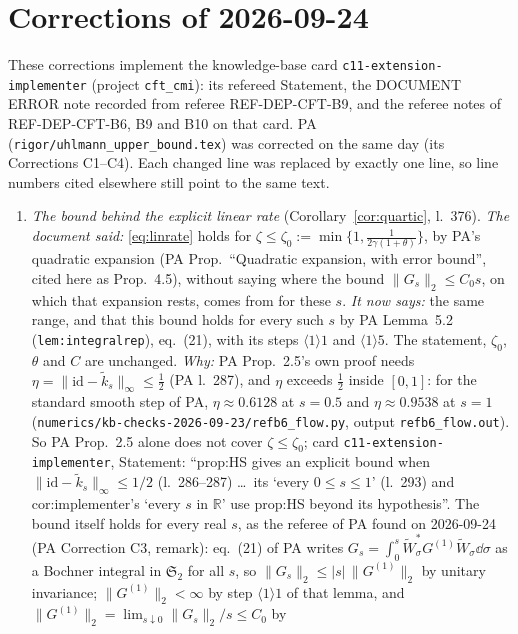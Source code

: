 \documentclass[11pt]{article}
\newcommand{\Wt}{\widetilde W}
\newcommand{\kt}{\widetilde k}
\newcommand{\Stwo}{\mathfrak S_2}
\newcommand{\norm}[1]{\lVert#1\rVert}
\newcommand{\abs}[1]{\lvert#1\rvert}
\begin{document}
\section{Corrections of 2026-09-24}\label{corr0924:sec}
\sloppy
These corrections implement the knowledge-base card \texttt{c11-extension-implementer} (project
\texttt{cft\_cmi}): its refereed Statement, the DOCUMENT ERROR note recorded from referee
REF-DEP-CFT-B9, and the referee notes of REF-DEP-CFT-B6, B9 and B10 on that card.  PA
(\texttt{rigor/uhlmann\_upper\_bound.tex}) was corrected on the same day (its Corrections C1--C4).
Each changed line was replaced by exactly one line, so line numbers cited elsewhere still point to
the same text.
\begin{enumerate}[label=(C\arabic*),ref=C\arabic*,leftmargin=3em]
\item\label{corr0924:C1} \emph{The bound behind the explicit linear rate}
 (Corollary~\ref{cor:quartic}, l.~376).
 \emph{The document said:} \eqref{eq:linrate} holds for $\zeta\le\zeta_0:=\min\{1,
 \frac1{2\gamma(1+\theta)}\}$, by PA's quadratic expansion (PA Prop.~``Quadratic expansion, with
 error bound'', cited here as Prop.~4.5), without saying where the bound $\norm{G_s}_2\le C_0s$, on
 which that expansion rests, comes from for these $s$.
 \emph{It now says:} the same range, and that this bound holds for every such $s$ by PA Lemma~5.2
 (\texttt{lem:integralrep}), eq.~(21), with its steps $\langle1\rangle1$ and $\langle1\rangle5$.  The statement,
 $\zeta_0$, $\theta$ and $C$ are unchanged.
 \emph{Why:} PA Prop.~2.5's own proof needs $\eta=\norm{\mathrm{id}-\kt_s}_\infty\le\frac12$
 (PA l.~287), and $\eta$ exceeds $\frac12$ inside $[0,1]$: for the standard smooth step of PA,
 $\eta\approx0.6128$ at $s=0.5$ and $\eta\approx0.9538$ at $s=1$
 (\texttt{numerics/kb-checks-2026-09-23/refb6\_flow.py}, output \texttt{refb6\_flow.out}).  So PA
 Prop.~2.5 alone does not cover $\zeta\le\zeta_0$; card \texttt{c11-extension-implementer},
 Statement: ``prop:HS gives an explicit bound when $\norm{\mathrm{id}-\tilde k_s}_\infty\le1/2$
 (l.~286--287) \dots\ its `every $0\le s\le1$' (l.~293) and cor:implementer's `every $s$ in
 $\mathbb R$' use prop:HS beyond its hypothesis''.  The bound itself holds for every real $s$, as
 the referee of PA found on 2026-09-24 (PA Correction C3, remark): eq.~(21) of PA writes
 $G_s=\int_0^s\Wt_\sigma^*G^{(1)}\Wt_\sigma\dd\sigma$ as a Bochner integral in $\Stwo$ for all $s$,
 so $\norm{G_s}_2\le\abs s\,\norm{G^{(1)}}_2$ by unitary invariance; $\norm{G^{(1)}}_2<\infty$ by step
 $\langle1\rangle1$ of that lemma, and $\norm{G^{(1)}}_2=\lim_{s\downarrow0}\norm{G_s}_2/s\le C_0$ by

\end{enumerate}
\end{document}
